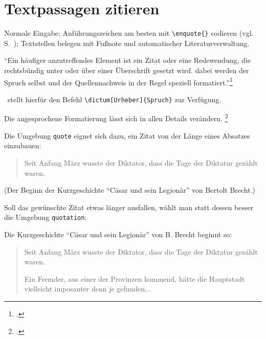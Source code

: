 \section{Textpassagen zitieren}


Normale Eingabe;
Anführungszeichen am besten mit \lstinline/\enquote{}/ codieren (vgl. S.~\pageref{enquote}); 
Textstellen belegen mit Fußnote und automatischer Literaturverwaltung.



\enquote{Ein häufiger anzutreffendes Element ist ein Zitat oder eine Redewendung, die rechtsbündig unter 
oder über einer Überschrift gesetzt wird. dabei werden der Spruch selbst und der Quellennachweis
in der Regel speziell formatiert.}\footcite[131]{kohm:2014}

\KOMAScript\ stellt hierfür den Befehl \lstinline/\dictum[Urheber]{Spruch}/ zur Verfügung.

Die angesprochene Formatierung lässt sich in allen Details verändern.
\footcite[vgl.][131\psqq]{kohm:2014}



Die Umgebung \lstinline/quote/ eignet sich dazu, ein Zitat von der Länge eines Absatzes einzubauen:

\begin{quote}
 Seit Anfang März wusste der Diktator, dass die Tage der Diktatur gezählt waren.
\end{quote}

(Der Beginn der Kurzgeschichte \enquote{Cäsar und sein Legionär} von Bertolt Brecht.)



Soll das gewünschte Zitat etwas länger ausfallen, wählt man statt dessen besser die 
Umgebung \lstinline/quotation/:

\begin{lfgwexample}{}
Die Kurzgeschichte \enquote{Cäsar und sein Legionär} von B. Brecht beginnt so:

\begin{quote}
 Seit Anfang März wusste der Diktator, dass die Tage der Diktatur gezählt waren.

 Ein Fremder, aus einer der Provinzen kommend, hätte die Hauptstadt vielleicht imposanter
 denn je gefunden... 
\end{quote}
\end{lfgwexample}

